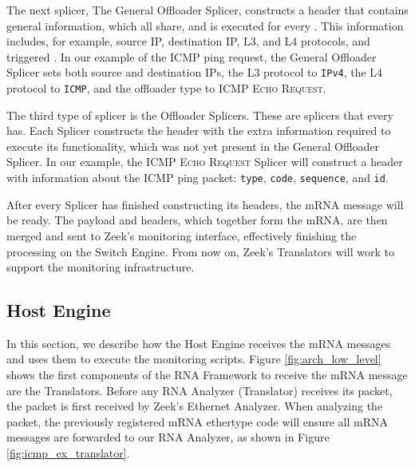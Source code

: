 
The next splicer, The General Offloader Splicer, constructs a header that contains general information, which all \Offloaders{} share, and is executed for every \Offloader{}. This information includes, for example, source IP, destination IP, L3, and L4 protocols, and triggered \Offloader{}. In our example of the ICMP ping request, the General Offloader Splicer sets both source and destination IPs, the L3 protocol to \texttt{IPv4}, the L4 protocol to \texttt{ICMP}, and the offloader type to \textsc{ICMP Echo Request}.

The third type of splicer is the Offloader Splicers. These are splicers that every \Offloader{} has. Each \Offloader{} Splicer constructs the header with the extra information required to execute its functionality, which was not yet present in the General Offloader Splicer. In our example, the \textsc{ICMP Echo Request} Splicer will construct a header with information about the ICMP ping packet: \texttt{type}, \texttt{code}, \texttt{sequence}, and \texttt{id}.




After every Splicer has finished constructing its headers, the mRNA message will be ready. The payload and headers, which together form the mRNA, are then merged and sent to Zeek's monitoring interface, effectively finishing the processing on the Switch Engine. From now on, Zeek's Translators will work to support the monitoring infrastructure.

\subsection{Host Engine}

In this section, we describe how the Host Engine receives the mRNA messages and uses them to execute the monitoring scripts. Figure \ref{fig:arch_low_level} shows the first components of the RNA Framework to receive the mRNA message are the Translators. Before any RNA Analyzer (Translator) receives its packet, the packet is first received by Zeek's Ethernet Analyzer. When analyzing the packet, the previously registered mRNA ethertype code will ensure all mRNA messages are forwarded to our RNA Analyzer, as shown in Figure \ref{fig:icmp_ex_translator}.

